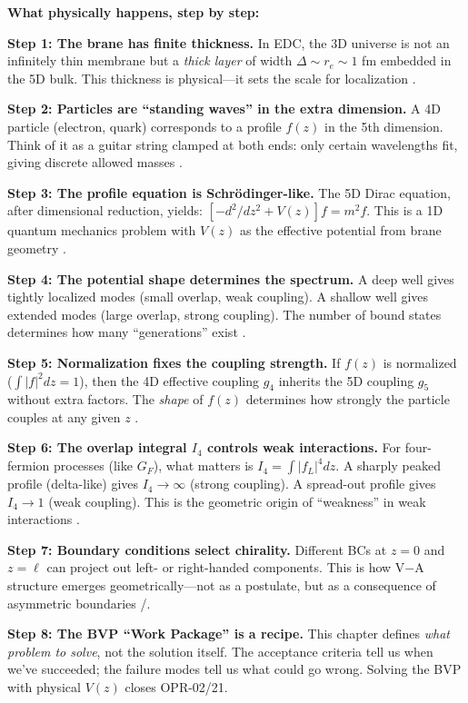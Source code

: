 \begin{tcolorbox}[colback=green!5!white, colframe=green!50!black,
    title=\textbf{Physical Process Narrative: From Brane Thickness to Effective Couplings}]
\textbf{What physically happens, step by step:}

\textbf{Step 1: The brane has finite thickness.}
In EDC, the 3D universe is not an infinitely thin membrane but a \emph{thick layer}
of width $\Delta \sim r_e \sim 1$ fm embedded in the 5D bulk. This thickness is
physical---it sets the scale for localization \tagP{}.

\textbf{Step 2: Particles are ``standing waves'' in the extra dimension.}
A 4D particle (electron, quark) corresponds to a profile $f(z)$ in the 5th dimension.
Think of it as a guitar string clamped at both ends: only certain wavelengths fit,
giving discrete allowed masses \tagP{}.

\textbf{Step 3: The profile equation is Schrödinger-like.}
The 5D Dirac equation, after dimensional reduction, yields:
$[-d^2/dz^2 + V(z)]f = m^2 f$. This is a 1D quantum mechanics problem with $V(z)$
as the effective potential from brane geometry \tagDc{}.

\textbf{Step 4: The potential shape determines the spectrum.}
A deep well gives tightly localized modes (small overlap, weak coupling).
A shallow well gives extended modes (large overlap, strong coupling).
The number of bound states determines how many ``generations'' exist \tagDc{}.

\textbf{Step 5: Normalization fixes the coupling strength.}
If $f(z)$ is normalized ($\int |f|^2 dz = 1$), then the 4D effective coupling $g_4$
inherits the 5D coupling $g_5$ without extra factors. The \emph{shape} of $f(z)$
determines how strongly the particle couples at any given $z$ \tagDc{}.

\textbf{Step 6: The overlap integral $I_4$ controls weak interactions.}
For four-fermion processes (like $G_F$), what matters is $I_4 = \int |f_L|^4 dz$.
A sharply peaked profile (delta-like) gives $I_4 \to \infty$ (strong coupling).
A spread-out profile gives $I_4 \to 1$ (weak coupling). This is the geometric
origin of ``weakness'' in weak interactions \tagDc{}.

\textbf{Step 7: Boundary conditions select chirality.}
Different BCs at $z = 0$ and $z = \ell$ can project out left- or right-handed
components. This is how V$-$A structure emerges geometrically---not as a postulate,
but as a consequence of asymmetric boundaries \tagP{}/\tagDc{}.

\textbf{Step 8: The BVP ``Work Package'' is a recipe.}
This chapter defines \emph{what problem to solve}, not the solution itself.
The acceptance criteria tell us when we've succeeded; the failure modes tell us
what could go wrong. Solving the BVP with physical $V(z)$ closes OPR-02/21.

\medskip
\noindent{}
\end{tcolorbox}

